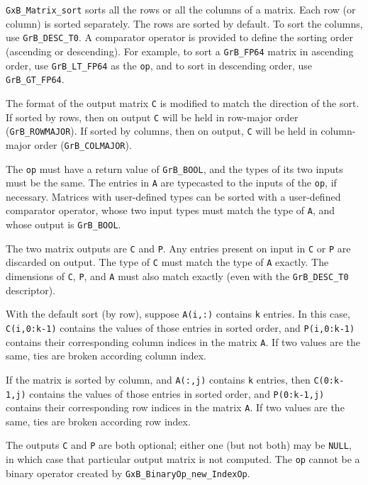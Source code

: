 \verb'GxB_Matrix_sort' sorts all the rows or all the columns of a matrix.
Each row (or column) is sorted separately.  The rows are sorted by default.
To sort the columns, use \verb'GrB_DESC_T0'.  A comparator operator is
provided to define the sorting order (ascending or descending).
For example, to sort a \verb'GrB_FP64' matrix in ascending order,
use \verb'GrB_LT_FP64' as the \verb'op', and to sort in descending order,
use \verb'GrB_GT_FP64'.

The format of the output matrix \verb'C' is modified to match the direction of
the sort.  If sorted by rows, then on output \verb'C' will be held in row-major
order (\verb'GrB_ROWMAJOR').  If sorted by columns, then on output, \verb'C'
will be held in column-major order (\verb'GrB_COLMAJOR').

The \verb'op' must have a return value of \verb'GrB_BOOL', and the types of
its two inputs must be the same.  The entries in \verb'A' are typecasted to
the inputs of the \verb'op', if necessary.  Matrices with user-defined types
can be sorted with a user-defined comparator operator, whose two input types
must match the type of \verb'A', and whose output is \verb'GrB_BOOL'.

The two matrix outputs are \verb'C' and \verb'P'.  Any entries present on input
in \verb'C' or \verb'P' are discarded on output.  The type of \verb'C' must
match the type of \verb'A' exactly.  The dimensions of \verb'C', \verb'P', and
\verb'A' must also match exactly (even with the \verb'GrB_DESC_T0'
descriptor).

With the default sort (by row), suppose \verb'A(i,:)' contains \verb'k'
entries.  In this case, \verb'C(i,0:k-1)' contains the values of those entries
in sorted order, and \verb'P(i,0:k-1)' contains their corresponding column
indices in the matrix \verb'A'.  If two values are the same, ties are broken
according column index.

If the matrix is sorted by column, and \verb'A(:,j)' contains \verb'k' entries,
then \verb'C(0:k-1,j)' contains the values of those entries in sorted order,
and \verb'P(0:k-1,j)' contains their corresponding row indices in the matrix
\verb'A'.  If two values are the same, ties are broken according row index.

The outputs \verb'C' and \verb'P' are both optional; either one (but not both)
may be \verb'NULL', in which case that particular output matrix is not
computed.
%
The \verb'op' cannot be a binary operator
created by \verb'GxB_BinaryOp_new_IndexOp'.


